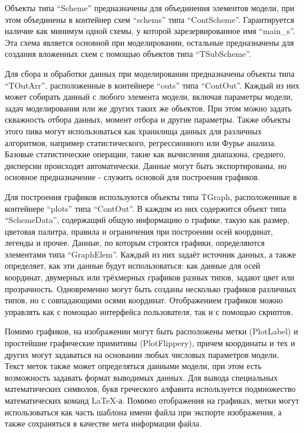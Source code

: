 Объекты типа ``Scheme'' предназначены для объединения элементов модели,
при этом объединены в контейнер схем ``schems'' типа ``ContScheme''.
Гарантируется наличие как минимум одной схемы,
у которой зарезервированное имя ``main\_s''.
Эта схема является основной при моделировании, остальные предназначены для
создания вложенных схем с помощью объектов типа ``TSubScheme''.

Для сбора и обработки данных при моделировании предназначены
объекты типа ``TOutArr'', расположенные в контейнере ``outs'' типа ``ContOut''.
Каждый из них может собирать данный с любого элемента модели,
включая параметры модели, задач моделирования или же других таких же
объектов. При этом можно задать скважность отбора данных,
момент отбора и другие параметры. Также объекты этого пива могут использоваться
как хранилища данных для различных алгоритмов, например
статистического, регрессионного или Фурье анализа. Базовые статистические операции, такие как
вычисления диапазона, среднего, дисперсии происходят автоматически.
Данные могут быть экспортированы, но основное предназначение -
служить основой для построения графиков.

Для построения графиков используются объекты типа TGraph,
расположенные в контейнере ``plots'' типа ``ContOut''.
В каждом из них содержится объект типа ``SchemeData'',
содержащий общую информацию о графике, такую как размер,
цветовая палитра, правила и ограничения при построении осей координат,
легенды и прочее.
Данные, по которым строятся графики, определяются элементами типа
``GraphElem''. Каждый из них задаёт источник данных,
а также определяет, как эти данные будут использоваться:
как данные для осей координат, двумерных или трёхмерных графиков разных типов,
задают цвет или прозрачность.
Одновременно могут быть созданы несколько графиков различных типов,
но с совпадающими осями координат.
Отображением графиков можно управлять как с помощью интерфейса пользователя,
так и с помощью скриптов.

Помимо графиков, на изображении могут быть расположены
метки (PlotLabel) и простейшие графические примитивы (PlotFlippery),
причем координаты и тех и других могут задаваться на основании
любых числовых параметров модели.
Текст меток также может определяться данными модели, при этом
есть возможность задавать формат выводимых данных.
Для вывода специальных математических символов, букв греческого алфавита
используется подмножество математических команд \LaTeX-а.
Помимо отображения на графиках, метки могут использоваться
как часть шаблона имени файла при экспорте изображения,
а также сохраняться в качестве мета информации файла.

